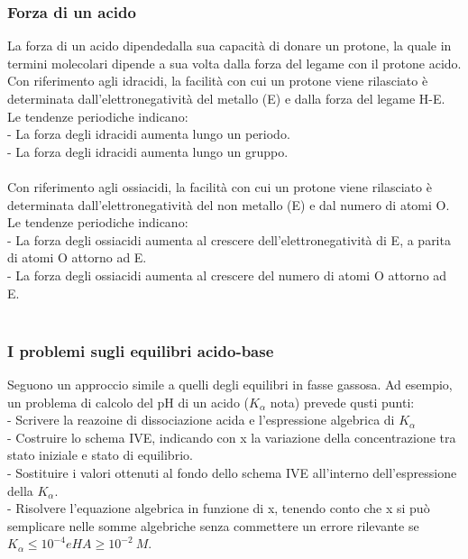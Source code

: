 \subsubsection{Forza di un acido}
La forza di un acido dipendedalla sua capacità di donare un protone, la quale in termini molecolari dipende a sua volta dalla forza del legame con il protone acido. \\
Con riferimento agli idracidi, la facilità con cui un protone viene rilasciato è determinata dall'elettronegatività del metallo (E) e dalla forza del legame H-E. Le tendenze periodiche indicano:\\
\tab- La forza degli idracidi aumenta lungo un periodo.\\
\tab- La forza degli idracidi aumenta lungo un gruppo. \\\\
Con riferimento agli ossiacidi, la facilità con cui un protone viene rilasciato è determinata dall'elettronegatività del non metallo (E) e dal numero di atomi O. Le tendenze periodiche indicano:\\
\tab- La forza degli ossiacidi aumenta al crescere dell'elettronegatività di E, a parita di atomi O attorno ad E.\\
\tab- La forza degli ossiacidi aumenta al crescere del numero di atomi O attorno ad E.\\\\
\subsubsection{I problemi sugli equilibri acido-base}
Seguono un approccio simile a quelli degli equilibri in fasse gassosa. Ad esempio, un problema di calcolo del pH di un acido ($K_\alpha$ nota) prevede qusti punti:\\
\tab- Scrivere la reazoine di dissociazione acida e l'espressione algebrica di $K_\alpha$\\
\tab- Costruire lo schema IVE, indicando con x la variazione della concentrazione tra stato iniziale e stato di equilibrio.\\
\tab- Sostituire i valori ottenuti al fondo dello schema IVE all'interno dell'espressione della $K_\alpha$.\\
\tab- Risolvere l'equazione algebrica in funzione di x, tenendo conto che x si può semplicare nelle somme algebriche senza commettere un errore rilevante se $K_\alpha \le 10^{-4} e HA \ge 10^{-2}\ M$.
